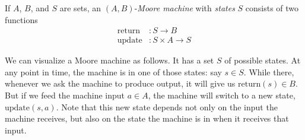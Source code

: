 \documentclass[Book-Poly]{subfiles}
\begin{document}
\begin{definition}\label{def.moore_machine}
If $A$, $B$, and $S$ are sets, an $(A,B)$-\emph{Moore machine} with \emph{states} $S$ consists of two functions
\begin{align*}
	\text{return}&\colon S\to B\\
	\text{update}&\colon S\times A\to S 
\end{align*}
\end{definition}

We can visualize a Moore machine as follows.
It has a set $S$ of possible states.
At any point in time, the machine is in one of those states: say $s \in S$.
While there, whenever we ask the machine to produce output, it will give us $\text{return}(s) \in B$.
But if we feed the machine input $a \in A$, the machine will switch to a new state, $\text{update}(s, a)$.
Note that this new state depends not only on the input the machine receives, but also on the state the machine is in when it receives that input.
\end{document}
